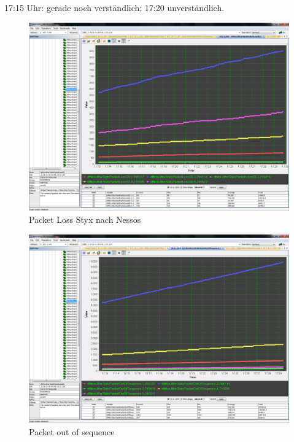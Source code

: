 \documentclass[a4paper,10pt]{scrartcl}
\begin{document}
17:15 Uhr: gerade noch verständlich; 17:20 unverständlich.

\begin{figure}[h]
 \centering
 \includegraphics[width=\textwidth]{./Bilder/C/plsd.png}
 \caption{Packet Loss Styx nach Nessos}
\end{figure}

\begin{figure}[h]
 \centering
 \includegraphics[width=\textwidth]{./Bilder/C/poos.png}
 \caption{Packet out of sequence}
\end{figure}
\end{document}
